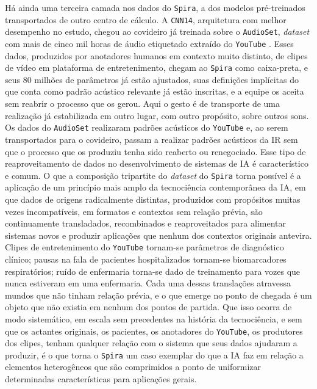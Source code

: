 Há ainda uma terceira camada nos dados do \texttt{Spira}, a dos modelos pré-treinados transportados de outro centro de cálculo. A \texttt{CNN14}, arquitetura com melhor desempenho no estudo, chegou ao covideiro já treinada sobre o \texttt{AudioSet}, \textit{dataset} com mais de cinco mil horas de áudio etiquetado extraído do \texttt{YouTube} \parencite{Gauy2024Discriminant}. Esses dados, produzidos por anotadores humanos em contexto muito distinto, de clipes de vídeo em plataforma de entretenimento, chegam ao \texttt{Spira} como caixa-preta, e seus 80 milhões de parâmetros já estão ajustados, suas definições implícitas do que conta como padrão acústico relevante já estão inscritas, e a equipe os aceita sem reabrir o processo que os gerou. Aqui o gesto é de transporte de uma realização já estabilizada em outro lugar, com outro propósito, sobre outros sons. Os dados do \texttt{AudioSet} realizaram padrões acústicos do \texttt{YouTube} e, ao serem transportados para o covideiro, passam a realizar padrões acústicos da IR sem que o processo que os produziu tenha sido reaberto ou renegociado. Esse tipo de reaproveitamento de dados no desenvolvimento de sistemas de IA é característico e comum. O que a composição tripartite do \textit{dataset} do \texttt{Spira} torna possível é a aplicação de um princípio mais amplo da tecnociência contemporânea da IA, em que dados de origens radicalmente distintas, produzidos com propósitos muitas vezes incompatíveis, em formatos e contextos sem relação prévia, são continuamente transladados, recombinados e reaproveitados para alimentar sistemas novos e produzir aplicações que nenhum dos contextos originais antevira. Clipes de entretenimento do \texttt{YouTube} tornam-se parâmetros de diagnóstico clínico; pausas na fala de pacientes hospitalizados tornam-se biomarcadores respiratórios; ruído de enfermaria torna-se dado de treinamento para vozes que nunca estiveram em uma enfermaria. Cada uma dessas translações atravessa mundos que não tinham relação prévia, e o que emerge no ponto de chegada é um objeto que não existia em nenhum dos pontos de partida. Que isso ocorra de modo sistemático, em escala sem precedentes na história da tecnociência, e sem que os actantes originais, os pacientes, os anotadores do \texttt{YouTube}, os produtores dos clipes, tenham qualquer relação com o sistema que seus dados ajudaram a produzir, é o que torna o \texttt{Spira} um caso exemplar do que a IA faz em relação a elementos heterogêneos que são comprimidos a ponto de uniformizar determinadas características para aplicações gerais.

